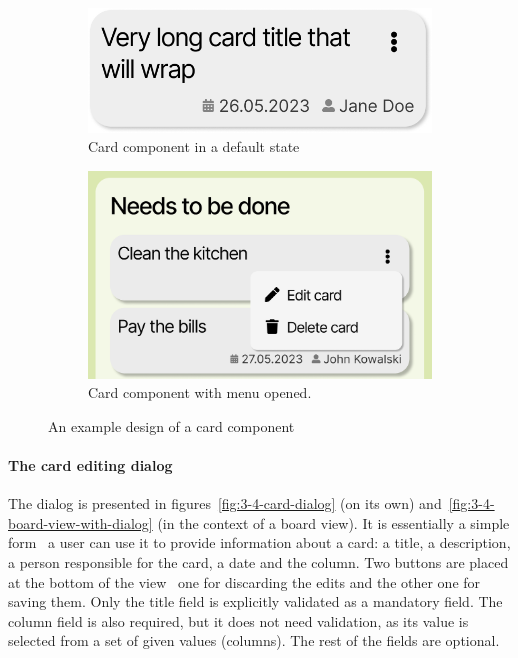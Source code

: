 \begin{figure}
    \centering
    \begin{subfigure}[m]{0.45\textwidth}
        \centering
        \includegraphics[width=\textwidth]{./3-research-methodology/card-component}
        \caption{Card component in a default state}
        \label{fig:3-4-card-component-plain}
    \end{subfigure}
    \hfill
    \begin{subfigure}[m]{0.45\textwidth}
        \centering
        \includegraphics[width=\textwidth]{./3-research-methodology/card-component-with-menu}
        \caption{Card component with menu opened.}
        \label{fig:3-4-card-component-with-menu}
    \end{subfigure}
    \caption{An example design of a card component}
    \label{fig:3-4-card-component}
\end{figure}

\paragraph{The card editing dialog}
The dialog is presented in figures~\ref{fig:3-4-card-dialog} (on its own) and~\ref{fig:3-4-board-view-with-dialog} (in the context of a board view).
It is essentially a simple form \textendash\ a user can use it to provide information about a card: a title, a description, a person responsible for the card, a date and the column.
Two buttons are placed at the bottom of the view \textendash\ one for discarding the edits and the other one for saving them.
Only the title field is explicitly validated as a mandatory field.
The column field is also required, but it does not need validation, as its value is selected from a set of given values (columns).
The rest of the fields are optional.


